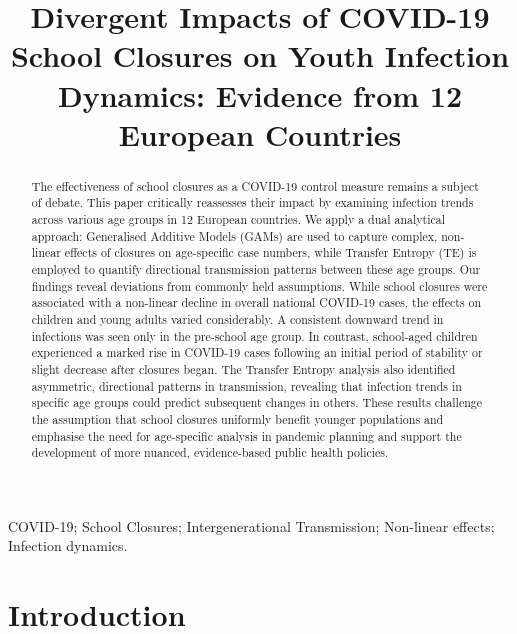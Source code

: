 \documentclass[]{interact}
\theoremstyle{plain}%
\theoremstyle{definition}
\theoremstyle{remark}
\begin{document}
\articletype{}

\title{Divergent Impacts of COVID-19 School Closures on Youth Infection Dynamics: Evidence from 12 European Countries}


\author{
}


\maketitle

\begin{abstract}
The effectiveness of school closures as a COVID-19 control measure remains a subject of debate. This paper critically reassesses their impact by examining infection trends across various age groups in 12 European countries. We apply a dual analytical approach: Generalised Additive Models (GAMs) are used to capture complex, non-linear effects of closures on age-specific case numbers, while Transfer Entropy (TE) is employed to quantify directional transmission patterns between these age groups. Our findings reveal deviations from commonly held assumptions. While school closures were associated with a non-linear decline in overall national COVID-19 cases, the effects on children and young adults varied considerably. A consistent downward trend in infections was seen only in the pre-school age group. In contrast, school-aged children experienced a marked rise in COVID-19 cases following an initial period of stability or slight decrease after closures began. The Transfer Entropy analysis also identified asymmetric, directional patterns in transmission, revealing that infection trends in specific age groups could predict subsequent changes in others. These results challenge the assumption that school closures uniformly benefit younger populations and emphasise the need for age-specific analysis in pandemic planning and support the development of more nuanced, evidence-based public health policies.
\end{abstract}

\begin{keywords}
COVID-19; School Closures; Intergenerational Transmission; Non-linear effects; Infection dynamics.
\end{keywords}







\section{Introduction}\label{introduction}
\end{document}
